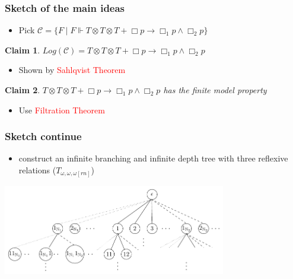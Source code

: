 \documentclass[hyperref={pdfpagelabels=false},t,10pt]{beamer}
\newtheorem{claim}{Claim}
\begin{document}
\begin{frame}
  \frametitle{Sketch of the main ideas}
  \begin{itemize}
    \item Pick $\mathcal{C} = \{F \mid F \Vdash T \otimes T\otimes T + \Box p \rightarrow \Box_1 p \land \Box_2 p\}$  \pause
    \end{itemize}

    \begin{claim}
      $Log(\mathcal{C}) = T \otimes T \otimes T + \Box p \rightarrow \Box_1 p \land \Box_2 p$
    \end{claim} \pause

    \begin{itemize}
      \item  Shown by \textcolor{red}{Sahlqvist Theorem}
    \end{itemize}

    \begin{claim}
      $T \otimes T \otimes T + \Box p \rightarrow \Box_1 p \land \Box_2 p$ has the finite model property
    \end{claim}

    \begin{itemize}
      \item Use \textcolor{red}{Filtration Theorem}
    \end{itemize}



\end{frame}

\begin{frame}
  \frametitle{Sketch continue}
  \begin{itemize}
    \item construct an infinite branching and infinite depth tree with three reflexive relations ($T_{\omega,\omega,\omega[rn]}$) \pause
  \end{itemize}
  \centering
  \includegraphics[width=0.73\textwidth]{Example7.pdf}
    
  \end{frame}
\end{document}

